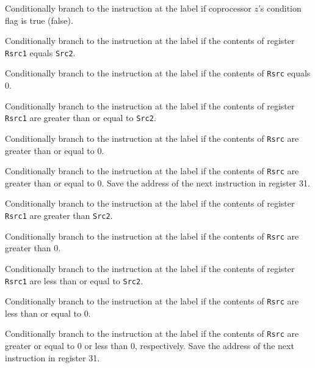 Conditionally branch to the instruction at the label if coprocessor
$z$'s condition flag is true (false).

Conditionally branch to the instruction at the label if the contents
of register {\tt Rsrc1} equals {\tt Src2}.

Conditionally branch to the instruction at the label if the contents
of {\tt Rsrc} equals 0.

Conditionally branch to the instruction at the label if the contents
of register {\tt Rsrc1} are greater than or equal to {\tt Src2}.

Conditionally branch to the instruction at the label if the contents
of {\tt Rsrc} are greater than or equal to 0.

Conditionally branch to the instruction at the label if the contents
of {\tt Rsrc} are greater than or equal to 0. Save the address of
the next instruction in register 31.

Conditionally branch to the instruction at the label if the contents
of register {\tt Rsrc1} are greater than {\tt Src2}.

Conditionally branch to the instruction at the label if the contents
of {\tt Rsrc} are greater than 0.

Conditionally branch to the instruction at the label if the contents
of register {\tt Rsrc1} are less than or equal to {\tt Src2}.

Conditionally branch to the instruction at the label if the contents
of {\tt Rsrc} are less than or equal to 0.

Conditionally branch to the instruction at the label if the contents
of {\tt Rsrc} are greater or equal to 0 or less than 0,
respectively. Save the address of the next instruction in register 31.

